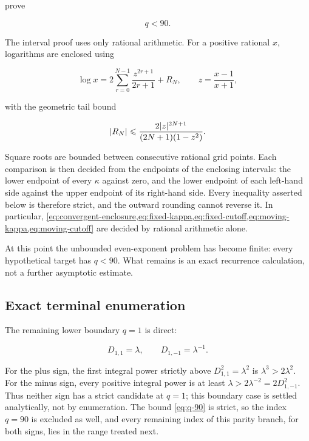 prove

\begin{equation}
 q<90.
 \label{eq:q-90}
\end{equation}

The interval proof uses only rational arithmetic. For a positive rational
$x$, logarithms are enclosed using

\begin{equation}
 \log x
 =2\sum_{r=0}^{N-1}\frac{z^{2r+1}}{2r+1}+R_N,
 \qquad
 z=\frac{x-1}{x+1},
 \label{eq:log-series}
\end{equation}

with the geometric tail bound

\begin{equation}
 \lvert R_N\rvert
 \leqslant\frac{2\lvert z\rvert^{2N+1}}{(2N+1)(1-z^2)}.
 \label{eq:log-tail}
\end{equation}

Square roots are bounded between consecutive rational grid points. Each
comparison is then decided from the endpoints of the enclosing intervals: the
lower endpoint of every $\kappa$ against zero, and the lower endpoint of each
left-hand side against the upper endpoint of its right-hand side. Every
inequality asserted below is therefore strict, and the outward rounding cannot
reverse it. In particular,
\cref{eq:convergent-enclosure,eq:fixed-kappa,eq:fixed-cutoff,eq:moving-kappa,eq:moving-cutoff}
are decided by rational arithmetic alone.

At this point the unbounded even-exponent problem has become finite: every
hypothetical target has $q<90$. What remains is an exact recurrence
calculation, not a further asymptotic estimate.

\subsection{Exact terminal enumeration}

The remaining lower boundary $q=1$ is direct:

\begin{equation}
 D_{1,1}=\lambda,
 \qquad
 D_{1,-1}=\lambda^{-1}.
 \label{eq:q1-boundary}
\end{equation}

For the plus sign, the first integral power strictly above
$D_{1,1}^2=\lambda^2$ is $\lambda^3>2\lambda^2$. For the minus sign, every
positive integral power is at least
$\lambda>2\lambda^{-2}=2D_{1,-1}^2$. Thus neither sign has a strict
candidate at $q=1$; this boundary case is settled analytically, not by
enumeration. The bound \cref{eq:q-90} is strict, so the index $q=90$ is
excluded as well, and every remaining index of this parity branch, for both
signs, lies in the range treated next.

